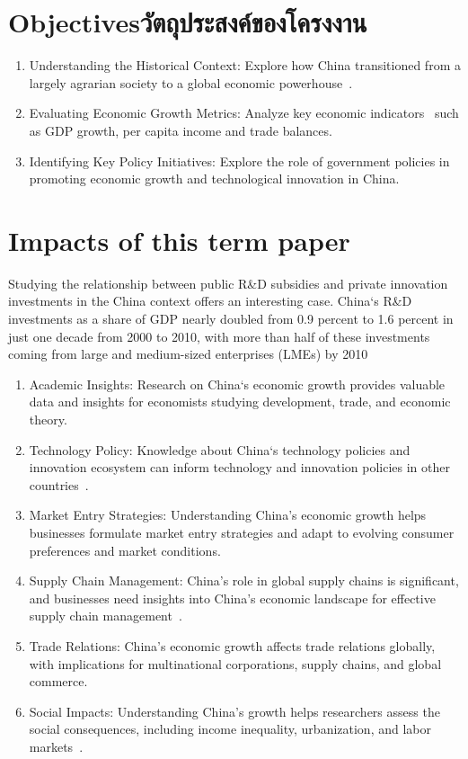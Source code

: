 \section{\ifenglish Objectives\else วัตถุประสงค์ของโครงงาน\fi}
\begin{enumerate}
    \item Understanding the Historical Context: Explore how China transitioned 
    from a largely agrarian society to a global economic powerhouse~\cite{academicoup}.
    \item Evaluating Economic Growth Metrics: Analyze key economic indicators~\cite{EconGrowthAnalyze}
    such as GDP growth, per capita income and trade balances.
    \item Identifying Key Policy Initiatives: Explore the role of government 
    policies in promoting economic growth and technological innovation in China.
\end{enumerate}

\section{Impacts of this term paper}

Studying the relationship between public R\&D subsidies and private innovation investments in the China 
context offers an interesting case. China`s R\&D investments as a share of GDP nearly doubled from 0.9 
percent to 1.6 percent in just one decade from 2000 to 2010, with more than half of these investments 
coming from large and medium-sized enterprises (LMEs) by 2010~\cite{BOEING2022121212}

\begin{enumerate}
    \item Academic Insights: Research on China`s economic growth provides valuable data and 
    insights for economists studying development, trade, and economic theory.
    \item Technology Policy: Knowledge about China`s technology policies and innovation ecosystem can 
    inform technology and innovation policies in other countries~\cite{surie2017creating}.
    \item Market Entry Strategies: Understanding China's economic growth helps businesses formulate 
    market entry strategies and adapt to evolving consumer preferences and market conditions.
    \item Supply Chain Management: China's role in global supply chains is significant, and businesses 
    need insights into China's economic landscape for effective supply chain management~\cite{li2009china}.
    \item Trade Relations: China's economic growth affects trade relations globally, with implications 
    for multinational corporations, supply chains, and global commerce.
    \item Social Impacts: Understanding China's growth helps researchers assess the social consequences, 
    including income inequality, urbanization, and labor markets~\cite{chen1996regional}.
\end{enumerate}
